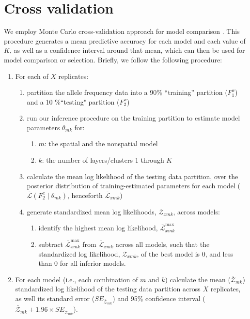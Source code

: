 \documentclass[12pt]{article}
\begin{document}
\newpage
\section{Cross validation}\label{Xvalidation}

We employ Monte Carlo cross-validation approach for model comparison \citep{picard1984}. 
This procedure generates a mean predictive accuracy for each model and each value of $K$, 
as well as a confidence interval around that mean,
which can then be used for model comparison or selection.
Briefly, we follow the following procedure:
\begin{enumerate}
\item For each of $X$ replicates:
	\begin{enumerate}
		\item partition the allele frequency data into a 90\% ``training'' partition ($F^x_1$) and a 10 \%``testing" partition ($F^x_2$) \label{partition}
		\item run our inference procedure on the training partition to estimate model parameters $\theta_{mk}$ for: \label{inference}
			\begin{enumerate}
				\item $m$: the spatial and the nonspatial model
				\item $k$: the number of layers/clusters 1 through $K$
			\end{enumerate}	
	\item calculate the mean log likelihood of the testing data partition, 
	over the posterior distribution of training-estimated parameters for each model 
	($\bar{\mathcal{L}}(F^x_2 \mid \theta_{mk})$, henceforth $\bar{\mathcal{L}}_{xmk}$) \label{lnL}
	\item generate standardized mean log likelihoods, $\mathcal{Z}_{xmk}$, across models: \label{standardize}
		\begin{enumerate}
			\item identify the highest mean log likelihood, $\bar{\mathcal{L}}^\text{max}_{xmk}$
			\item subtract $\bar{\mathcal{L}}^\text{max}_{xmk}$ from $\bar{\mathcal{L}}_{xmk}$ across all models,
				such that the standardized log likelihood, $\mathcal{Z}_{xmk}$, of the best model is 0,
				and less than 0 for all inferior models. 
		\end{enumerate}
	\end{enumerate}
\item For each model (i.e., each combination of $m$ and $k$) calculate 
	the mean ($	\bar{\mathcal{Z}}_{mk} $) standardized log likelihood of the testing data partition across $X$ replicates, 
	as well its standard error ($SE_{\bar{\mathcal{Z}}_{mk}}$) and
        95\% confidence interval ($\bar{\mathcal{Z}}_{mk} \pm 1.96 \times SE_{\bar{\mathcal{Z}}_{mk}}$).
\end{enumerate}
\end{document}
